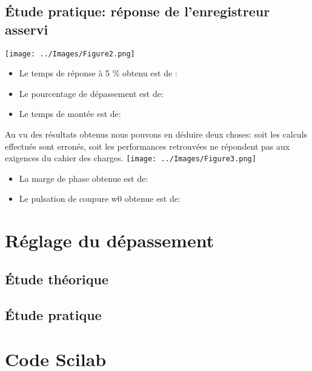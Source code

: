 \documentclass[a4paper,12pt]{article}
\begin{document}
		\subsection{Étude pratique: réponse de l'enregistreur asservi}
			\begin{center}
				\texttt{[image: ../Images/Figure2.png]} 	
				\begin{itemize}
					\item Le temps de réponse à 5 \% obtenu est de :
					\item Le pourcentage de dépassement est de:
					\item Le temps de montée est de: 			
				\end{itemize}
				Au vu des résultats obtenus nous pouvons en déduire deux choses: soit les calculs effectués sont erronés, soit les performances retrouvées ne répondent pas aux exigences du cahier des charges.
				\texttt{[image: ../Images/Figure3.png]}
				\begin{itemize}
					\item La marge de phase obtenue est de:
					\item Le pulsation de coupure w0 obtenue est de:
				\end{itemize}
			\end{center}


	\section{Réglage du dépassement}
		\subsection{Étude théorique}
			\newpage
		\subsection{Étude pratique} 

	\section{Code Scilab}
		\begin{center}
			
			
			
		\end{center}
\end{document}
